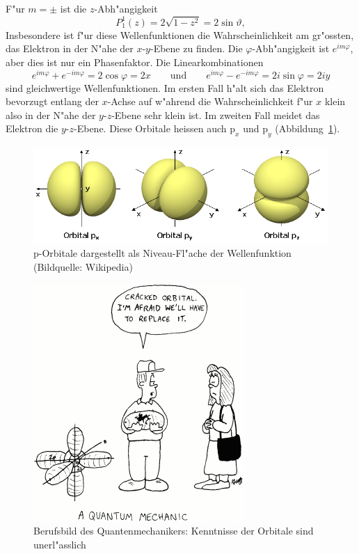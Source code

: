 F"ur $m=\pm$ ist die $z$-Abh"angigkeit
\[
P_1^1(z)=2\sqrt{1-z^2} = 2\sin\vartheta,
\]
Insbesondere ist f"ur diese Wellenfunktionen die Wahrscheinlichkeit 
am gr"ossten, das Elektron in der N"ahe der $x$-$y$-Ebene zu finden.
Die $\varphi$-Abh"angigkeit ist $e^{im\varphi}$, aber dies ist
nur ein Phasenfaktor.
Die Linearkombinationen
\[
e^{im\varphi}+e^{-im\varphi}=2\cos\varphi=2x
\qquad\text{und}\qquad
e^{im\varphi}-e^{-im\varphi}=2i\sin\varphi=2iy
\]
sind gleichwertige Wellenfunktionen.
Im ersten Fall h"alt sich das Elektron bevorzugt entlang der $x$-Achse
auf w"ahrend die Wahrscheinlichkeit f"ur $x$ klein also in der N"ahe der
$y$-$z$-Ebene sehr klein ist.
Im zweiten Fall meidet das Elektron die $y$-$z$-Ebene.
Diese Orbitale heissen auch $\text{p}_x$ und $\text{p}_y$
(Abbildung~\ref{skript:porbitale}).

\begin{figure}
\centering
\includegraphics[width=\hsize]{images/orbital.png}
\caption{p-Orbitale dargestellt als Niveau-Fl"ache der Wellenfunktion
(Bildquelle: Wikipedia)
\label{skript:porbitale}}
\end{figure}

\begin{figure}
\centering
\includegraphics[width=0.4\hsize]{images/crackedorbital.png}
\caption{Berufsbild des Quantenmechanikers: Kenntnisse der Orbitale
sind unerl"asslich\label{skript:crackedorbital}}
\end{figure}
